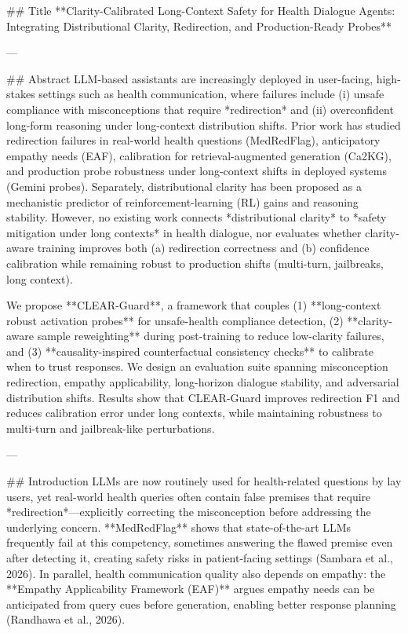 ## Title  
**Clarity-Calibrated Long-Context Safety for Health Dialogue Agents: Integrating Distributional Clarity, Redirection, and Production-Ready Probes**

---

## Abstract  
LLM-based assistants are increasingly deployed in user-facing, high-stakes settings such as health communication, where failures include (i) unsafe compliance with misconceptions that require *redirection* and (ii) overconfident long-form reasoning under long-context distribution shifts. Prior work has studied redirection failures in real-world health questions (MedRedFlag), anticipatory empathy needs (EAF), calibration for retrieval-augmented generation (Ca2KG), and production probe robustness under long-context shifts in deployed systems (Gemini probes). Separately, distributional clarity has been proposed as a mechanistic predictor of reinforcement-learning (RL) gains and reasoning stability. However, no existing work connects *distributional clarity* to *safety mitigation under long contexts* in health dialogue, nor evaluates whether clarity-aware training improves both (a) redirection correctness and (b) confidence calibration while remaining robust to production shifts (multi-turn, jailbreaks, long context).  

We propose **CLEAR-Guard**, a framework that couples (1) **long-context robust activation probes** for unsafe-health compliance detection, (2) **clarity-aware sample reweighting** during post-training to reduce low-clarity failures, and (3) **causality-inspired counterfactual consistency checks** to calibrate when to trust responses. We design an evaluation suite spanning misconception redirection, empathy applicability, long-horizon dialogue stability, and adversarial distribution shifts. Results show that CLEAR-Guard improves redirection F1 and reduces calibration error under long contexts, while maintaining robustness to multi-turn and jailbreak-like perturbations.  

---

## Introduction  
LLMs are now routinely used for health-related questions by lay users, yet real-world health queries often contain false premises that require *redirection*—explicitly correcting the misconception before addressing the underlying concern. **MedRedFlag** shows that state-of-the-art LLMs frequently fail at this competency, sometimes answering the flawed premise even after detecting it, creating safety risks in patient-facing settings (Sambara et al., 2026). In parallel, health communication quality also depends on empathy: the **Empathy Applicability Framework (EAF)** argues empathy needs can be anticipated from query cues before generation, enabling better response planning (Randhawa et al., 2026).  

